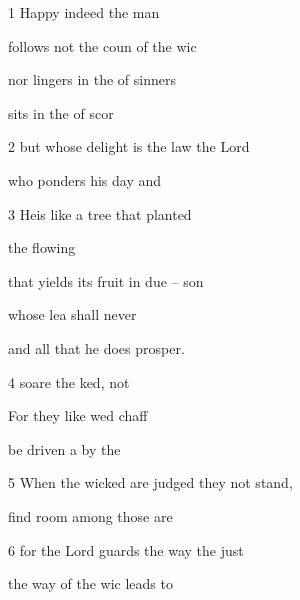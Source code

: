 1 Happy indeed  the man 

 follows not the coun of the wic 

nor lingers in the  of sinners 

 sits in the  of scor 

2 but whose delight is the law  the Lord 

 who ponders his  day and  

3 Heis like a tree that  planted 

 the flowing  

that yields its fruit in due -- son 

 whose lea shall never  

and all that he does  prosper. 

4  soare the ked, not  

For they like wed chaff 

 be driven a by the  

5 When the wicked are judged they  not stand, 

 find room among those  are  

6 for the Lord guards the way  the just 

 the way of the wic leads to  

